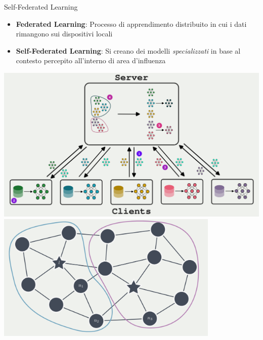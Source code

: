 \documentclass[presentation, 10pt,aspectratio=169]{beamer}\mode<presentation>{\usetheme{AMSBolognaFC}}
\begin{document}
\begin{frame}{Self-Federated Learning}
\begin{minipage}{0.4\textwidth}
	\begin{itemize}
		\item \textbf{Federated Learning}: Processo di apprendimento distribuito in cui i dati rimangono sui dispositivi locali
		\item \textbf{Self-Federated Learning}: Si creano dei modelli \emph{specializzati} in base al contesto percepito all'interno di \alert{area d'influenza}
	\end{itemize}
\end{minipage}
\begin{minipage}{0.5\textwidth}
\centering
\includegraphics[width=\textwidth]{img/cluster-federated.png}
\includegraphics[width=0.8\textwidth]{img/field-informed.png}
\end{minipage}
\end{frame}
\end{document}
